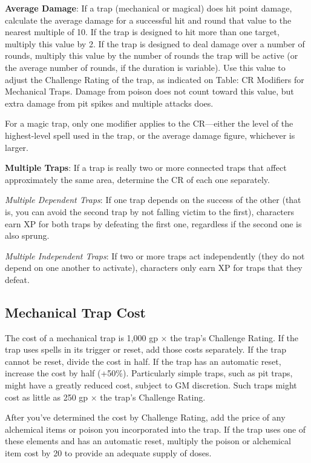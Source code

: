 \textbf{Average Damage}: If a trap (mechanical or magical) does hit point damage, calculate the average damage for a successful hit and round that value to the nearest multiple of 10. If the trap is designed to hit more than one target, multiply this value by 2. If the trap is designed to deal damage over a number of rounds, multiply this value by the number of rounds the trap will be active (or the average number of rounds, if the duration is variable). Use this value to adjust the Challenge Rating of the trap, as indicated on Table: CR Modifiers for Mechanical Traps. Damage from poison does not count toward this value, but extra damage from pit spikes and multiple attacks does.
				
For a magic trap, only one modifier applies to the CR---either the level of the highest-level spell used in the trap, or the average damage figure, whichever is larger.
				
\textbf{Multiple Traps}: If a trap is really two or more connected traps that affect approximately the same area, determine the CR of each one separately.
				
\textit{Multiple Dependent Traps}: If one trap depends on the success of the other (that is, you can avoid the second trap by not falling victim to the first), characters earn XP for both traps by defeating the first one, regardless if the second one is also sprung.
				
\textit{Multiple Independent Traps}: If two or more traps act independently (they do not depend on one another to activate), characters only earn XP for traps that they defeat.
				
\subsection{Mechanical Trap Cost}

				
The cost of a mechanical trap is 1,000 gp \mbox{$\times$} the trap's Challenge Rating. If the trap uses spells in its trigger or reset, add those costs separately. If the trap cannot be reset, divide the cost in half. If the trap has an automatic reset, increase the cost by half (+50\%). Particularly simple traps, such as pit traps, might have a greatly reduced cost, subject to GM discretion. Such traps might cost as little as 250 gp \mbox{$\times$} the trap's Challenge Rating.
				
After you've determined the cost by Challenge Rating, add the price of any alchemical items or poison you incorporated into the trap. If the trap uses one of these elements and has an automatic reset, multiply the poison or alchemical item cost by 20 to provide an adequate supply of doses.
				

